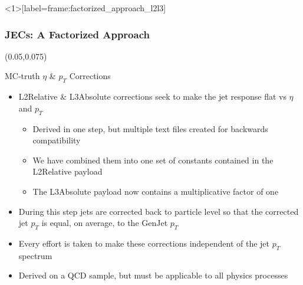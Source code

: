 \begin{frame}<1>[label=frame:factorized_approach_l2l3]
	\frametitle{JECs: A Factorized Approach}
        \begin{textblock}{.9}(0.05,0.075)
		\begin{figure}
			\label{fig:factorized_approach}
		\end{figure}
	\end{textblock}
	\vspace*{2.3cm}
	\begin{block}{MC-truth $\eta$ \& $p_{T}$ Corrections}
		\begin{itemize}
			\footnotesize
			\item L2Relative \& L3Absolute corrections seek to make the jet response flat vs $\eta$ and $p_{T}$
			\begin{itemize}
				\item Derived in one step, but multiple text files created for backwards compatibility
				\item We have combined them into one set of constants contained in the L2Relative payload
				\item The L3Absolute payload now contains a multiplicative factor of one
			\end{itemize}
			\item During this step jets are corrected back to particle level so that the corrected jet $p_{T}$ is equal, on average, to the GenJet $p_{T}$
			\item Every effort is taken to make these corrections independent of the jet $p_{T}$ spectrum
			\item Derived on a QCD sample, but must be applicable to all physics processes
		\end{itemize}			
	\end{block}
\end{frame}
